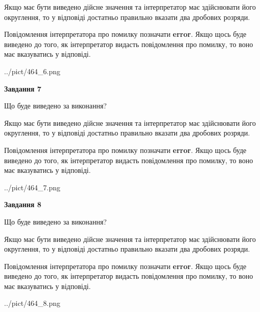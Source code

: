 \documentclass[12pt, ukrainian]{article}
\begin{document}
{\begin {Large}
Якщо має бути виведено дійсне значення та інтерпретатор має здійснювати його округлення, 
то у відповіді достатньо правильно вказати два дробових розряди.

Повідомлення інтерпретатора про помилку позначати \textbf{error}.
Якщо щось буде виведено до того, як інтерпретатор видасть повідомлення про помилку, 
то воно має вказуватись у відповіді. \par

\begin{center}
	{../pict/464_6.png}
\end{center}
\newpage

{\begin {center}\textbf{Завдання 7}\end {center}}\par
Що буде виведено за виконання? \par

Якщо має бути виведено дійсне значення та інтерпретатор має здійснювати його округлення, 
то у відповіді достатньо правильно вказати два дробових розряди.

Повідомлення інтерпретатора про помилку позначати \textbf{error}.
Якщо щось буде виведено до того, як інтерпретатор видасть повідомлення про помилку, 
то воно має вказуватись у відповіді. \par

\begin{center}
	{../pict/464_7.png}
\end{center}
\newpage

{\begin {center}\textbf{Завдання 8}\end {center}}\par
Що буде виведено за виконання? \par

Якщо має бути виведено дійсне значення та інтерпретатор має здійснювати його округлення, 
то у відповіді достатньо правильно вказати два дробових розряди.

Повідомлення інтерпретатора про помилку позначати \textbf{error}.
Якщо щось буде виведено до того, як інтерпретатор видасть повідомлення про помилку, 
то воно має вказуватись у відповіді. \par

\begin{center}
	{../pict/464_8.png}
\end{center}
\newpage


\end{Large}}
\end{document}
